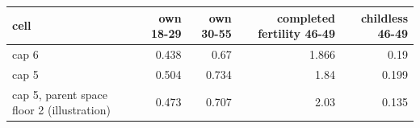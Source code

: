 \begin{tabular}{lrrrr}
\toprule
cell & own 18-29 & own 30-55 & completed fertility 46-49 & childless 46-49 \\
\midrule
cap 6 & 0.438 & 0.67 & 1.866 & 0.19 \\
cap 5 & 0.504 & 0.734 & 1.84 & 0.199 \\
cap 5, parent space floor 2 (illustration) & 0.473 & 0.707 & 2.03 & 0.135 \\
\bottomrule
\end{tabular}
